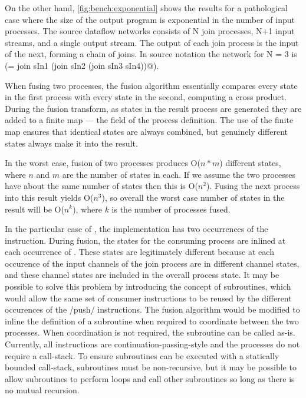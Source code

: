 On the other hand, \cref{fig:bench:exponential} shows the results for a pathological case where the size of the output program is exponential in the number of input processes. The source dataflow networks consists of N join processes, N+1 input streams, and a single output stream. The output of each join process is the input of the next, forming a chain of joins. In source notation the network for N = 3 is (\Hs@sOut = join sIn1 (join sIn2 (join sIn3 sIn4))@).

When fusing two processes, the fusion algorithm essentially compares every state in the first process with every state in the second, computing a cross product. During the fusion transform, as states in the result process are generated they are added to a finite map --- the \Hs@instrs@ field of the process definition. The use of the finite map ensures that identical states are always combined, but genuinely different states always make it into the result. 

In the worst case, fusion of two processes produces O($n*m$) different states, where $n$ and $m$ are the number of states in each. If we assume the two processes have about the same number of states then this is O($n^2$). Fusing the next process into this result yields O($n^3$), so overall the worst case number of states in the result will be O($n^k$), where $k$ is the number of processes fused. 

In the particular case of \Hs@join@, the implementation has two occurrences of the \Hs@push@ instruction.
During fusion, the states for the consuming process are inlined at each occurrence of \Hs@push@.
These states are legitimately different because at each occurence of \Hs@push@ the input channels of the join process are in different channel states, and these channel states are included in the overall process state.
It may be possible to solve this problem by introducing the concept of subroutines, which would allow the same set of consumer instructions to be reused by the different occurences of the \Hs/push/ instructions.
The fusion algorithm would be modified to inline the definition of a subroutine when required to coordinate between the two processes.
When coordination is not required, the subroutine can be called as-is.
Currently, all instructions are continuation-passing-style and the processes do not require a call-stack.
To ensure subroutines can be executed with a statically bounded call-stack, subroutines must be non-recursive, but it may be possible to allow subroutines to perform loops and call other subroutines so long as there is no mutual recursion.

